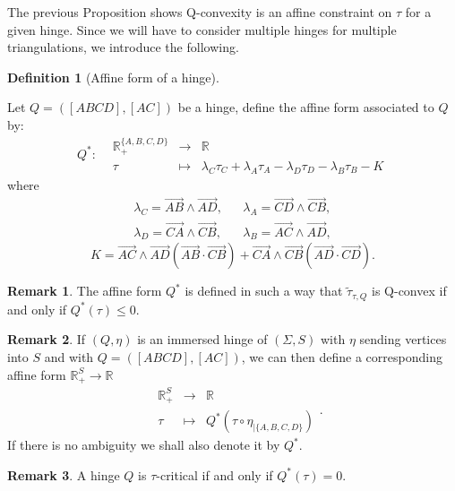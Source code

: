 \documentclass[a4paper,12pt]{article}
\def\RR{\mathbb{R}}
\newcommand{\function}[5]{\displaystyle#1:\begin{array}{l|rcl}
& \displaystyle #2 & \longrightarrow & \displaystyle #3 \\
	& \displaystyle #4 & \longmapsto & \displaystyle #5 \end{array}}
\newcommand{\functionn}[4]{\displaystyle\begin{array}{l|rcl}
& \displaystyle #1 & \longrightarrow & \displaystyle #2 \\
	& \displaystyle #3 & \longmapsto & \displaystyle #4 \end{array}}
\newcommand{\tautilde}[2]{\widetilde\tau_{#1,#2}}
\theoremstyle{definition}
\newtheorem{defi}[lem]{Definition}	%
\newtheorem*{rem}{Remark}			 %
\begin{document}
						The previous Proposition shows Q-convexity is an affine constraint on $\tau$ for a given hinge. Since we will have to consider multiple hinges for multiple triangulations, we introduce the following.
						\begin{defi}[Affine form of a hinge] \label{defi:Q_forme_affine}

							Let $Q=([ABCD],[AC])$ be a hinge, define the affine form associated to $Q$ by:
							$$\function{Q^*}{\RR_+^{\{A,B,C,D\}}}{\RR}{\tau}{
								 \lambda_C\tau_C+
								 \lambda_A\tau_A
									-\lambda_D\tau_D-
									\lambda_B\tau_B-K
								 }
							$$
							where
							\begin{eqnarray*}
							 \lambda_C=\overrightarrow{AB}\wedge\overrightarrow{AD},&&\lambda_A=\overrightarrow{CD} \wedge\overrightarrow{CB},\\
							 \lambda_D=\overrightarrow{CA}\wedge \overrightarrow{CB},&&\lambda_B=\overrightarrow{AC}\wedge \overrightarrow{AD},
							\end{eqnarray*}
							 $$K= \overrightarrow{AC}\wedge \overrightarrow{AD}
								\left(\overrightarrow{AB}\cdot \overrightarrow{CB}\right)
							 +
							 \overrightarrow{CA}\wedge \overrightarrow{CB}
								\left(\overrightarrow{AD}\cdot \overrightarrow{CD}\right).$$
	
						
						
						\end{defi}
						\begin{rem}\label{rem:forme_linaire_Qconvexe} The affine form $Q^*$ is defined in such a way that $\tautilde{\tau}{Q}$
						is Q-convex if and only if $Q^*(\tau)\leq 0$.
						\end{rem}


						\begin{rem}
						 If $(Q,\eta)$ is an immersed hinge of $(\Sigma, S)$ with $\eta$ sending vertices into $S$
						 and with $Q=([ABCD],[AC])$,
						 we can then define a corresponding affine form $\RR_+^{S}\rightarrow \RR$
						 $$\functionn{\RR_+^S}{\RR}{\tau}{Q^*(\tau\circ \eta_{|\{A,B,C,D\} }) }.$$
						 If there is no ambiguity we shall also denote it by $Q^*$.
						\end{rem}
						\begin{rem} A hinge $Q$ is $\tau$-critical if and only if $Q^*(\tau)=0$.

						\end{rem}
\end{document}
